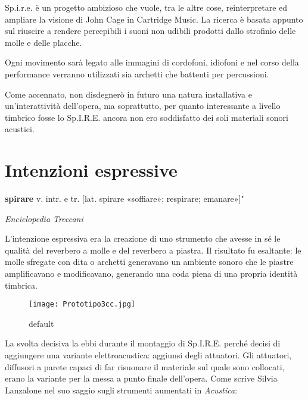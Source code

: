 Sp.i.r.e. è un progetto ambizioso che vuole, tra le altre cose, reinterpretare ed ampliare la visione di John Cage in Cartridge Music. La ricerca è basata appunto sul riuscire a rendere percepibili i suoni non udibili prodotti dallo strofinio delle molle e delle placche.

Ogni movimento sarà legato alle immagini di cordofoni, idiofoni e nel corso della performance verranno utilizzati sia archetti che battenti per percussioni.

Come accennato, non disdegnerò in futuro una natura installativa e un'interattività dell'opera, ma soprattutto, per quanto interessante a livello timbrico fosse lo Sp.I.R.E. ancora non ero soddisfatto dei soli materiali sonori acustici.

\section{Intenzioni espressive}

\epigraph{\textbf{spirare} v. intr. e tr. [lat. spirare «soffiare»; respirare; emanare»]"}
{\textit{Enciclopedia Treccani}}

L'intenzione espressiva era la creazione di uno strumento che avesse in sé le qualità del reverbero a molle e del reverbero a piastra. Il risultato fu esaltante: le molle sfregate con dita o archetti generavano un ambiente sonoro che le piastre amplificavano e modificavano, generando una coda piena di una propria identità timbrica.


\begin{figure}[htbp]
\begin{center}
\texttt{[image: Prototipo3cc.jpg]}
\caption{default}
\label{default}
\end{center}
\end{figure}

La svolta decisiva la ebbi durante il montaggio di Sp.I.R.E. perché decisi di aggiungere una variante elettroacustica: aggiunsi degli attuatori. Gli attuatori, diffusori a parete capaci di far risuonare il materiale sul quale sono collocati, erano la variante per la messa a punto finale dell'opera.
Come scrive Silvia Lanzalone nel suo saggio sugli strumenti aumentati in \textit{Acustica}:

